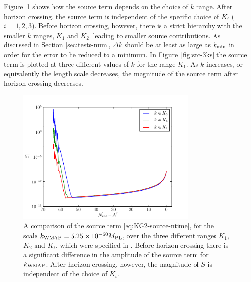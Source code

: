 % 
Figure~\ref{fig:src-kwmap-3ranges} shows how the source term depends on
the choice of $k$ range.  After horizon crossing, the source term
is independent of the specific choice of $K_i$ ($i=1,2,3$). Before horizon crossing,
however, there is a
strict hierarchy with the smaller $k$ ranges, $K_1$ and $K_2$, leading to
smaller source
contributions.  As discussed in Section \ref{sec:tests-num}, $\Delta k$
should be at least as large as $k_{\mathrm{min}}$ in order for the error to be reduced to
a minimum. In Figure~\ref{fig:src-3ks} the source term is plotted at three different
values of $k$ for the range $K_1$. As $k$ increases, or equivalently the length scale
decreases, the magnitude of the source term after horizon crossing decreases. 
% 
\begin{figure}[htbp]
\centering
 \includegraphics[width=0.8\textwidth]{numerical/graphs/src-kwmap-3ranges-large}
\caption[Comparison of Source Term for Different $k$ Ranges]{A comparison of the
source
term \eqref{eq:KG2-source-ntime}, for the scale $k_\mathrm{WMAP}=5.25\times 10^{-60}M_{\mathrm{PL}}$, over the
three different ranges $K_1$,
$K_2$ and $K_3$, which were specified in . Before horizon
crossing there is a significant difference in the amplitude of the source term for
$k_\mathrm{WMAP}$. After horizon crossing, however, the magnitude of $S$ is independent of
the choice of $K_i$.
} 
\label{fig:src-kwmap-3ranges}
\end{figure}
% 
